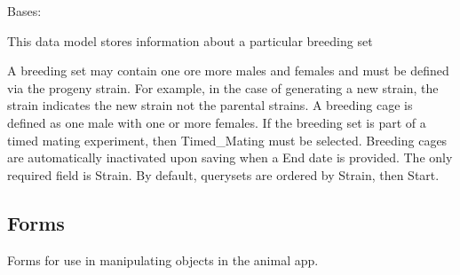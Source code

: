 \documentclass[letterpaper,10pt,english]{sphinxmanual}
\begin{document}

\begin{fulllineitems}
Bases: 

This data model stores information about a particular breeding set

A breeding set may contain one ore more males and females and must be defined via the progeny strain.  For example, in the case of generating a new strain, the strain indicates the new strain not the parental strains.  A breeding cage is defined as one male with one or more females.  If the breeding set is part of a timed mating experiment, then Timed\_Mating must be selected.  Breeding cages are automatically inactivated upon saving when a End date is provided.  The only required field is Strain.  By default, querysets are ordered by Strain, then Start.

\end{fulllineitems}



\subsection{Forms}
\label{api:id4}\label{api:module-mousedb.animal.forms}
Forms for use in manipulating objects in the animal app.

\end{document}
